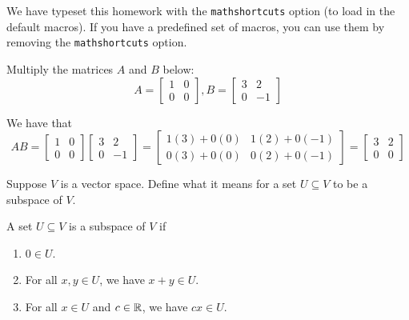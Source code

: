 \documentclass[mathshortcuts]{homework}
\begin{document}
		\maketitle
		We have typeset this homework with the \texttt{mathshortcuts} option (to load in the default macros). If you have a predefined set of macros, you can use them by removing the \texttt{mathshortcuts} option.

		\begin{problem}
				Multiply the matrices $A$ and $B$ below:
				\begin{equation*}
						A = \begin{bmatrix}
								1 & 0 \\ 0 & 0
						\end{bmatrix}, B = \begin{bmatrix}
								3 & 2 \\ 0 & -1
						\end{bmatrix}
				\end{equation*}
		\end{problem}
		\begin{soln}
				 We have that 
				 \begin{equation}
				 		AB = \begin{bmatrix}
								1 & 0 \\ 0 & 0
						\end{bmatrix}\begin{bmatrix}
								3 & 2 \\ 0 & -1
						\end{bmatrix} = \begin{bmatrix}
								1(3) + 0(0) & 1(2) + 0(-1)  \\ 
								0(3) + 0(0) & 0(2) + 0(-1)
						\end{bmatrix} = \begin{bmatrix}
								3 & 2 \\ 0 & 0
						\end{bmatrix}
				 \end{equation}
		\end{soln}

		\begin{problem}
				Suppose $V$ is a vector space. Define what it means for a set $U \subseteq V$ to be a subspace of $V$.
		\end{problem}
		\begin{soln}
				A set $U \subseteq V$ is a subspace of $V$ if
				\begin{enumerate}
						\item $0\in U$. 
						\item For all $x,y\in U$, we have $x+y\in U$. 
						\item For all $x\in U$ and $c\in \mathbb{R}$, we have $cx \in U$.
				\end{enumerate}
		\end{soln}
\end{document}
